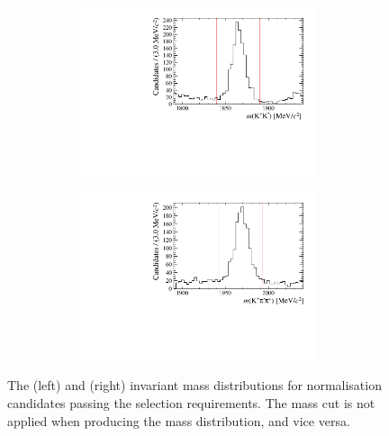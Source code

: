 \begin{figure}[!h]
\begin{subfigure}[t]{1.0\textwidth}
   \centering
     \begin{subfigure}[t]{0.35\textwidth}
        \centering
        \includegraphics[width=1.0\textwidth]{figs/Selection/Phimass_KPiPi_B2DsD0.pdf}
     \end{subfigure}
     \begin{subfigure}[t]{0.35\textwidth}
        \centering
        \includegraphics[width=1.0\textwidth]{figs/Selection/Dmass_KPiPi_B2DsD0.pdf}
     \end{subfigure}
     \caption{\decay{\Bp}{(\decay{\Dsp}{\Kp\pim\pip})\Dzb}}
   \end{subfigure}
   \caption{The \Dzb (left) and \Dsp (right) invariant mass distributions for normalisation \decay{\Bp}{\Dsp\Dzb} candidates passing the selection requirements. The \Dsp mass cut is not applied when producing the \Dzb mass distribution, and vice versa.}
   \label{fig:d_phi_mass_normlaisation}   
\end{figure}
